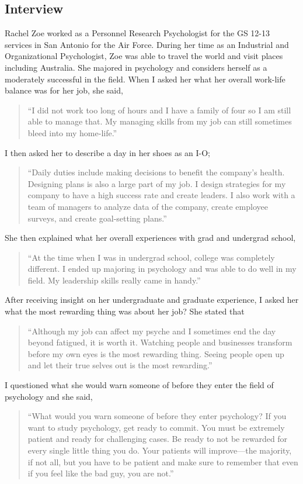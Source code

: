 \begin{multicols}{2}
\section{Interview}
    Rachel Zoe worked as a Personnel Research Psychologist for the GS 12-13 services in San Antonio for the Air Force. During her time as an Industrial and Organizational Psychologist, Zoe was able to travel the world and visit places including Australia. She majored in psychology and considers herself as a moderately successful in the field. When I asked her what her overall work-life balance was for her job, she said,
    \begin{quote}
        “I did not work too long of hours and I have a family of four so I am still able to manage  that. My managing skills from my job can still sometimes bleed into my home-life.”
    \end{quote}
    I then asked her to describe a day in her shoes as an I-O; 
    \begin{quote}
        “Daily duties include making decisions to benefit the company’s health. Designing plans  is also a large part of my job. I design strategies for my company to have a high success  rate and create leaders. I also work with a team of managers to analyze data of the company, create employee surveys, and create goal-setting plans.”
    \end{quote}
    She then explained what her overall experiences with grad and undergrad school,  
    \begin{quote}
        “At the time when I was in undergrad school, college was completely different. I ended  up majoring in psychology and was able to do well in my field. My leadership skills really came in handy.”
    \end{quote}
    After receiving insight on her undergraduate and graduate experience, I asked her what the most rewarding thing was about her job? She stated that 
    \begin{quote}
        “Although my job can affect my psyche and I sometimes end the day beyond fatigued, it   is worth it. Watching people and businesses transform before my own eyes is the most rewarding thing. Seeing people open up and let their true selves out is the most rewarding.” 
    \end{quote}
    I questioned what she would warn someone of before they enter the field of psychology and she said, 
    \begin{quote}
        “What would you warn someone of before they enter psychology? If you want to study   psychology, get ready to commit. You must be extremely patient and ready for challenging cases. Be ready to not be rewarded for every single little thing you do. Your patients will improve—the majority, if not all, but you have to be patient and make sure to remember that even if you feel like the bad guy, you are not.”
    \end{quote}


\end{multicols}
